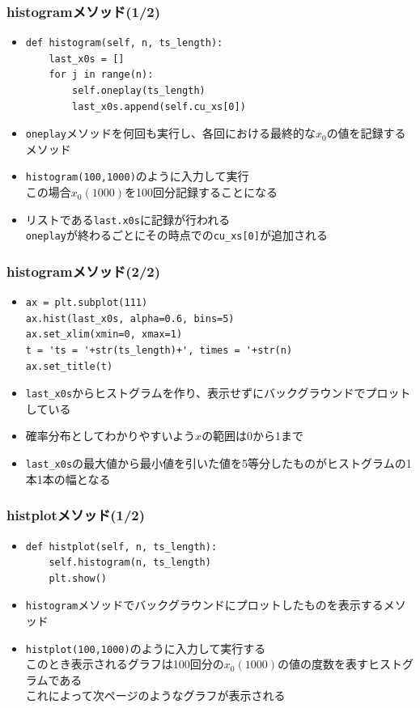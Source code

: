 \documentclass[dvipdfmx,fleqn,handout]{beamer}
\begin{document}
\begin{frame}[fragile]%
\frametitle{histogramメソッド(1/2)}
\begin{itemize}\setlength{\parskip}{0.5em}
\item
\footnotesize
\begin{verbatim}
def histogram(self, n, ts_length):
    last_x0s = []
    for j in range(n):
        self.oneplay(ts_length)
        last_x0s.append(self.cu_xs[0])
\end{verbatim}\pause
\normalsize
\item
\verb|oneplay|メソッドを何回も実行し、各回における最終的な$x_0$の値を記録するメソッド
\pause
\item
\verb|histogram(100,1000)|のように入力して実行\pause\\
この場合$x_0(1000)$を100回分記録することになる
\pause
\item
リストである\verb|last.x0s|に記録が行われる\pause\\
\verb|oneplay|が終わるごとにその時点での\verb|cu_xs[0]|が追加される
\end{itemize}
\end{frame}


\begin{frame}[fragile]%
\frametitle{histogramメソッド(2/2)}
\begin{itemize}\setlength{\parskip}{0.5em}
\item
\footnotesize
\begin{verbatim}
ax = plt.subplot(111)
ax.hist(last_x0s, alpha=0.6, bins=5)
ax.set_xlim(xmin=0, xmax=1)
t = 'ts = '+str(ts_length)+', times = '+str(n)
ax.set_title(t)
\end{verbatim}\pause
\normalsize
\pause
\item
\verb|last_x0s|からヒストグラムを作り、表示せずにバックグラウンドでプロットしている
\pause
\item
確率分布としてわかりやすいよう$x$の範囲は0から1まで
\item
\verb|last_x0s|の最大値から最小値を引いた値を5等分したものがヒストグラムの1本1本の幅となる
\end{itemize}
\end{frame}


\begin{frame}[fragile]%
\frametitle{histplotメソッド(1/2)}
\begin{itemize}\setlength{\parskip}{0.5em}
\item
\footnotesize
\begin{verbatim}
def histplot(self, n, ts_length):
    self.histogram(n, ts_length)
    plt.show()
\end{verbatim}
\normalsize
\pause
\item
\verb|histogram|メソッドでバックグラウンドにプロットしたものを表示するメソッド
\item
\verb|histplot(100,1000)|のように入力して実行する\pause\\
このとき表示されるグラフは100回分の$x_0(1000)$の値の度数を表すヒストグラムである
\pause
\\
これによって次ページのようなグラフが表示される
\end{itemize}
\end{frame}
\end{document}
